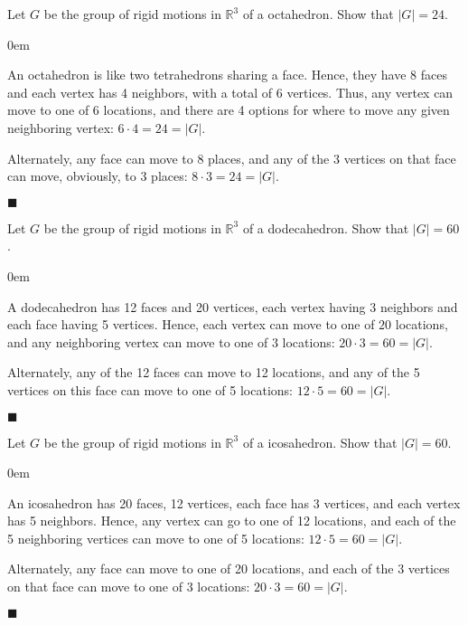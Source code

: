 \documentclass[12pt]{article}
\renewcommand{\qed}{\hfill$\blacksquare$}
\renewenvironment{proof}{\begin{addmargin}[1em]{0em}\begin{newproof}}{\end{newproof}\end{addmargin}\qed}
\newenvironment{problem}[2][Exercise]{\begin{trivlist}
\item[\hskip \labelsep {\bfseries #1}\hskip \labelsep {\bfseries #2.}]}{\end{trivlist}}
\begin{document}
\begin{problem}{1.2.11}
Let $G$ be the group of rigid motions in $\mathbb{R}^3$ of a octahedron. Show that $\left|G\right|=24$.
\end{problem}
\begin{proof}
An octahedron is like two tetrahedrons sharing a face. Hence, they have 8 faces and each vertex has 4 neighbors, with a total of 6 vertices. Thus, any vertex can move to one of 6 locations, and there are 4 options for where to move any given neighboring vertex: $6\cdot 4 = 24=\left|G\right|$.

Alternately, any face can move to $8$ places, and any of the 3 vertices on that face can move, obviously, to 3 places: $8\cdot 3 = 24 =\left|G\right|$.
\end{proof}


\begin{problem}{1.2.12}
Let $G$ be the group of rigid motions in $\mathbb{R}^3$ of a dodecahedron. Show that $\left|G\right|=60$.
\end{problem}
\begin{proof}
A dodecahedron has 12 faces and 20 vertices, each vertex having 3 neighbors and each face having 5 vertices. Hence, each vertex can move to one of $20$ locations, and any neighboring vertex can move to one of $3$ locations: $20\cdot 3 = 60 = \left|G\right|$.

Alternately, any of the 12 faces can move to 12 locations, and any of the 5 vertices on this face can move to one of 5 locations: $12\cdot 5 = 60=\left|G\right|$.
\end{proof}


\begin{problem}{1.2.13}
Let $G$ be the group of rigid motions in $\mathbb{R}^3$ of a icosahedron. Show that $\left|G\right|=60$.
\end{problem}
\begin{proof}
An icosahedron has 20 faces, 12 vertices, each face has 3 vertices, and each vertex has 5 neighbors. Hence, any vertex can go to one of 12 locations, and each of the 5 neighboring vertices can move to one of 5 locations: $12\cdot 5 = 60 = \left|G\right|$.

Alternately, any face can move to one of 20 locations, and each of the 3 vertices on that face can move to one of 3 locations: $20\cdot 3 = 60 = \left|G\right|$.
\end{proof}
\end{document}
